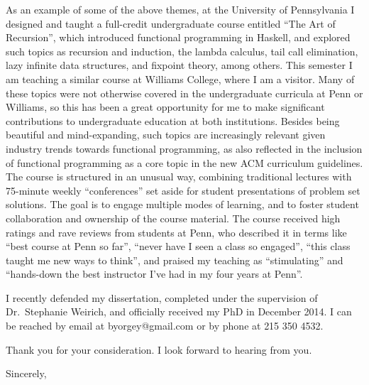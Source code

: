 \begin{letter}{\thereaddress}
{  As an example of some of the above themes, at the University of
  Pennsylvania I designed and taught a full-credit undergraduate
  course entitled ``The Art of Recursion'', which introduced
  functional programming in Haskell, and explored such topics as
  recursion and induction, the lambda calculus, tail call elimination,
  lazy infinite data structures, and fixpoint theory, among others.
  This semester I am teaching a similar course at Williams College,
  where I am a visitor.  Many of these topics were not otherwise
  covered in the undergraduate curricula at Penn or Williams, so this
  has been a great opportunity for me to make significant
  contributions to undergraduate education at both institutions.
  Besides being beautiful and mind-expanding, such topics are
  increasingly relevant given industry trends towards functional
  programming, as also reflected in the inclusion of functional
  programming as a core topic in the new ACM curriculum guidelines.
  The course is structured in an unusual way, combining traditional
  lectures with 75-minute weekly ``conferences'' set aside for student
  presentations of problem set solutions.  The goal is to engage
  multiple modes of learning, and to foster student collaboration and
  ownership of the course material. The course received high ratings
  and rave reviews from students at Penn, who described it in terms
  like ``best course at Penn so far'', ``never have I seen a class so
  engaged'', ``this class taught me new ways to think'', and praised
  my teaching as ``stimulating'' and ``hands-down the best instructor
  I've had in my four years at Penn''.

} %

\placespecific

I recently defended my dissertation, completed under the supervision
of Dr.\ Stephanie Weirich, and officially received my PhD in December
2014.  I can be reached by email at \textsf{byorgey@gmail.com} or by
phone at \textsf{215 350 4532}.

Thank you for your consideration.  I look forward to hearing from you.

\closing{Sincerely,}

\end{letter}


